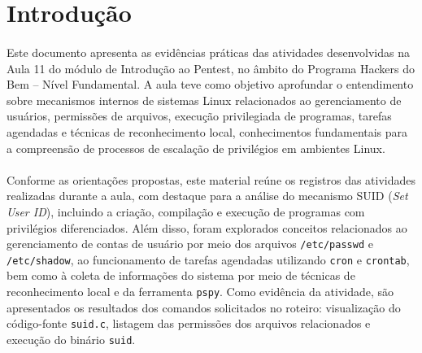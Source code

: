 \section{Introdução}

\paragraph{}
Este documento apresenta as evidências práticas das atividades desenvolvidas na
Aula 11 do módulo de Introdução ao Pentest, no âmbito do Programa Hackers do
Bem -- Nível Fundamental. A aula teve como objetivo aprofundar o entendimento
sobre mecanismos internos de sistemas Linux relacionados ao gerenciamento de
usuários, permissões de arquivos, execução privilegiada de programas, tarefas
agendadas e técnicas de reconhecimento local, conhecimentos fundamentais para a
compreensão de processos de escalação de privilégios em ambientes Linux.

\paragraph{}
Conforme as orientações propostas, este material reúne os registros das
atividades realizadas durante a aula, com destaque para a análise do mecanismo
SUID (\textit{Set User ID}), incluindo a criação, compilação e execução de
programas com privilégios diferenciados. Além disso, foram explorados conceitos
relacionados ao gerenciamento de contas de usuário por meio dos arquivos
\texttt{/etc/passwd} e \texttt{/etc/shadow}, ao funcionamento de tarefas
agendadas utilizando \texttt{cron} e \texttt{crontab}, bem como à coleta de
informações do sistema por meio de técnicas de reconhecimento local e da
ferramenta \texttt{pspy}. Como evidência da atividade, são apresentados os
resultados dos comandos solicitados no roteiro: visualização do código-fonte
\texttt{suid.c}, listagem das permissões dos arquivos relacionados e execução
do binário \texttt{suid}.
